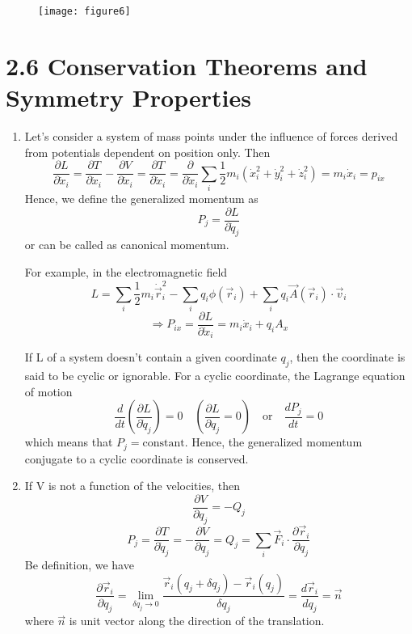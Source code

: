 \documentclass[12pt]{article}
\begin{document}
	
    \begin{figure}[h]
	    \centering
	    \texttt{[image: figure6]}
    	\caption{}
	    \label{fig:figure6}
    \end{figure}
    
    
    \section*{2.6 Conservation Theorems and Symmetry Properties}
    \begin{enumerate}
    	\item Let's consider a system of mass points under the influence of forces derived from potentials dependent on position only. Then
    	$$ \frac{\partial L}{\partial \dot{x}_i} = \frac{\partial T}{\partial \dot{x}_i} - \frac{\partial V}{\partial \dot{x}_i} = \frac{\partial T}{\partial \dot{x}_i} = \frac{\partial}{\partial \dot{x}_i} \sum_i \frac{1}{2} m_i (\dot{x}_i^2 + \dot{y}_i^2 + \dot{z}_i^2) = m_i \dot{x}_i = p_{ix} $$
    	Hence, we define the generalized momentum as
    	$$ P_j = \frac{\partial L}{\partial \dot{q}_j} $$
    	or can be called as canonical momentum.
    	
    	For example, in the electromagnetic field
    	$$ L = \sum_i \frac{1}{2} m_i \dot{\vec{r}}_i^2 - \sum_i q_i \phi(\vec{r}_i) + \sum_i q_i \vec{A}(\vec{r}_i) \cdot \vec{v}_i $$
    	$$ \Rightarrow P_{ix} = \frac{\partial L}{\partial \dot{x}_i} = m_i \dot{x}_i + q_i A_x $$
    	
    	If L of a system doesn't contain a given coordinate $q_j$, then the coordinate is said to be cyclic or ignorable.
    	For a cyclic coordinate, the Lagrange equation of motion
    	$$ \frac{d}{dt} \left( \frac{\partial L}{\partial \dot{q}_j} \right) = 0 \quad \left( \frac{\partial L}{\partial q_j} = 0 \right) \quad \text{or} \quad \frac{d P_j}{dt} = 0 $$
    	which means that $P_j = \text{constant}$.
    	Hence, the generalized momentum conjugate to a cyclic coordinate is conserved.
    	
    	\item If V is not a function of the velocities, then
    	$$ \frac{\partial V}{\partial q_j} = -Q_j $$
    	$$ P_j = \frac{\partial T}{\partial \dot{q}_j} = - \frac{\partial V}{\partial q_j} = Q_j = \sum_i \vec{F}_i \cdot \frac{\partial \vec{r}_i}{\partial q_j} $$
    	Be definition, we have
    	$$ \frac{\partial \vec{r}_i}{\partial q_j} = \lim_{\delta q_j \to 0} \frac{\vec{r}_i(q_j + \delta q_j) - \vec{r}_i(q_j)}{\delta q_j} = \frac{d\vec{r}_i}{dq_j} = \vec{n} $$
    	where $\vec{n}$ is unit vector along the direction of the translation.
    	

\end{enumerate}
\end{document}

